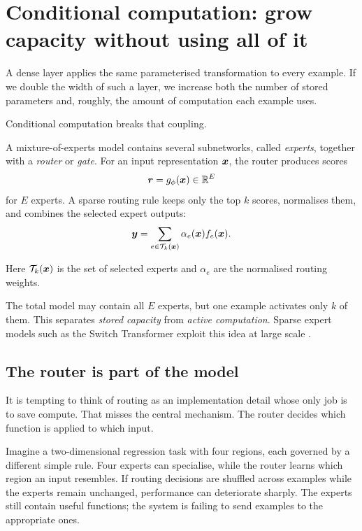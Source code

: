 \section{Conditional computation: grow capacity without using all of it}

A dense layer applies the same parameterised transformation to every example. If we double the width of such a layer, we increase both the number of stored parameters and, roughly, the amount of computation each example uses.

Conditional computation breaks that coupling.

A mixture-of-experts model contains several subnetworks, called \emph{experts}, together with a \emph{router} or \emph{gate}. For an input representation \(\bm{x}\), the router produces scores
\[
  \bm{r}=g_\phi(\bm{x})\in\mathbb{R}^E
\]
for \(E\) experts. A sparse routing rule keeps only the top \(k\) scores, normalises them, and combines the selected expert outputs:
\begin{equation}
  \bm{y}
  = \sum_{e\in\mathcal{T}_k(\bm{x})}
      \alpha_e(\bm{x}) f_e(\bm{x}).
  \label{eq:week10-moe}
\end{equation}

Here \(\mathcal{T}_k(\bm{x})\) is the set of selected experts and \(\alpha_e\) are the normalised routing weights.

The total model may contain all \(E\) experts, but one example activates only \(k\) of them. This separates \emph{stored capacity} from \emph{active computation}. Sparse expert models such as the Switch Transformer exploit this idea at large scale \parencite{fedus2022}.

\subsection{The router is part of the model}

It is tempting to think of routing as an implementation detail whose only job is to save compute. That misses the central mechanism. The router decides which function is applied to which input.

Imagine a two-dimensional regression task with four regions, each governed by a different simple rule. Four experts can specialise, while the router learns which region an input resembles. If routing decisions are shuffled across examples while the experts remain unchanged, performance can deteriorate sharply. The experts still contain useful functions; the system is failing to send examples to the appropriate ones.

